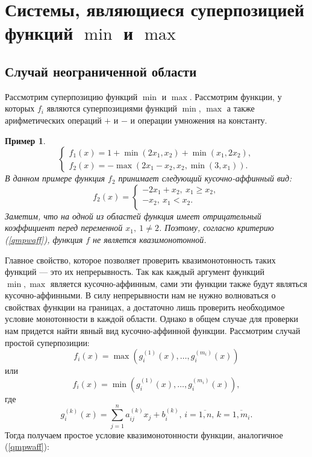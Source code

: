 \documentclass{article}
\renewcommand{\ge}{\geqslant}
\newtheorem{example}{Пример}
\theoremstyle{definition}
\begin{document}
\section{Системы, являющиеся суперпозицией функций \(\min\) и \(\max\)}

\subsection{Случай неограниченной области}
Рассмотрим суперпозицию функций \(\min\) и \(\max\). Рассмотрим функции, у которых \(f_i\) являются суперпозициями функций \(\min\), \(\max\) а также арифметических операций \(+\) и \(-\) и операции умножения на константу.
\begin{example}
	\[\begin{cases}
		f_1(x) = 1 + \min(2x_1,x_2) + \min(x_1, 2x_2), \\
		f_2(x) = -\max(2x_1 - x_2, x_2, \min(3, x_1)).
	\end{cases}\]
	В данном примере функция \(f_2\) принимает следующий кусочно-аффинный вид:
	\[
		f_2(x) = \begin{cases}
			-2x_1 + x_2,\ x_1 \ge x_2,\\
			-x_2,\ x_1 < x_2. \\
		\end{cases}
	\]
	Заметим, что на одной из областей функция имеет отрицательный коэффициент перед переменной \(x_1,\ 1 \neq 2\). Поэтому, согласно критерию (\ref{qmpwaff}), функция \(f\) не является квазимонотонной.
\end{example}
Главное свойство, которое позволяет проверить квазимонотонность таких функций --- это их непрерывность. Так как каждый аргумент функций \(\min, \max\) является кусочно-аффинным, сами эти функции также будут являться кусочно-аффинными. В силу непрерывности нам не нужно волноваться о свойствах функции на границах, а достаточно лишь проверить необходимое условие монотонности в каждой области. Однако в общем случае для проверки нам придется найти явный вид кусочно-аффинной функции.
Рассмотрим случай простой суперпозиции:
\begin{equation} \label{fmax}
f_i(x) = \max(g_i^{(1)}(x),\dots,g_i^{(m_i)}(x))
\end{equation}
или
\begin{equation} \label{fmin}
f_i(x) = \min(g_i^{(1)}(x),\dots,g_i^{(m_i)}(x)),
\end{equation}
где
\[g_i^{(k)}(x) = \sum_{j=1}^n a_{ij}^{(k)} x_j + b_i^{(k)},\, i = \overline{1, n},\, k = \overline{1, m_i}.\]
Тогда получаем простое условие квазимонотонности функции, аналогичное (\ref{qmpwaff}):
\end{document}
